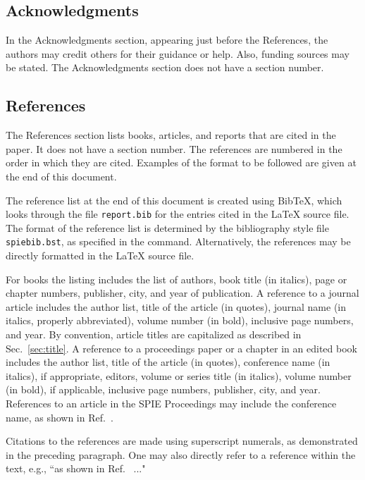 \documentclass[a4paper]{spie}  %
\begin{document}
\subsection{Acknowledgments} 
In the Acknowledgments section, appearing just before the References, the authors may credit others for their guidance or help.  Also, funding sources may be stated.  The Acknowledgments section does not have a section number.

\subsection{References} 
The References section lists books, articles, and reports that are cited in the paper.  It does not have a section number.  The references are numbered in the order in which they are cited.  Examples of the format to be followed are given at the end of this document.  

The reference list at the end of this document is created using BibTeX, which looks through the file {\tt report.bib} for the entries cited in the LaTeX source file.  The format of the reference list is determined by the bibliography style file {\tt spiebib.bst}, as specified in the \verb|| command.  Alternatively, the references may be directly formatted in the LaTeX source file.

For books\cite{Lamport94,Alred03,Goossens97} the listing includes the list of authors, book title (in italics), page or chapter numbers, publisher, city, and year of publication.  A reference to a journal article\cite{Metropolis53} includes the author list, title of the article (in quotes), journal name (in italics, properly abbreviated), volume number (in bold), inclusive page numbers, and year.  By convention\cite{Lamport94}, article titles are capitalized as described in Sec.~\ref{sec:title}.  A reference to a proceedings paper or a chapter in an edited book\cite{Gull89a} includes the author list, title of the article (in quotes), conference name (in italics), if appropriate, editors, volume or series title (in italics), volume number (in bold), if applicable, inclusive page numbers, publisher, city, and year.  References to an article in the SPIE Proceedings may include the conference name, as shown in Ref.~.

Citations to the references are made using superscript numerals, as demonstrated in the preceding paragraph.  One may also directly refer to a reference within the text, e.g., ``as shown in Ref.~ ..." 
\end{document}
